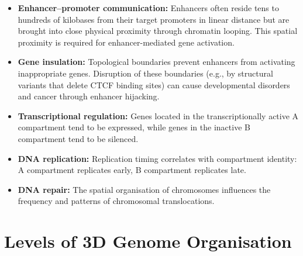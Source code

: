 \begin{itemize}[itemsep=3pt]
  \item \textbf{Enhancer--promoter communication:} Enhancers often reside tens to hundreds of kilobases from their target promoters in linear distance but are brought into close physical proximity through chromatin looping. This spatial proximity is required for enhancer-mediated gene activation.
  \item \textbf{Gene insulation:} Topological boundaries prevent enhancers from activating inappropriate genes. Disruption of these boundaries (e.g., by structural variants that delete CTCF binding sites) can cause developmental disorders and cancer through enhancer hijacking.
  \item \textbf{Transcriptional regulation:} Genes located in the transcriptionally active A compartment tend to be expressed, while genes in the inactive B compartment tend to be silenced.
  \item \textbf{DNA replication:} Replication timing correlates with compartment identity: A compartment replicates early, B compartment replicates late.
  \item \textbf{DNA repair:} The spatial organisation of chromosomes influences the frequency and patterns of chromosomal translocations.
\end{itemize}

\section{Levels of 3D Genome Organisation}
\label{sec:3dgenome:levels}

